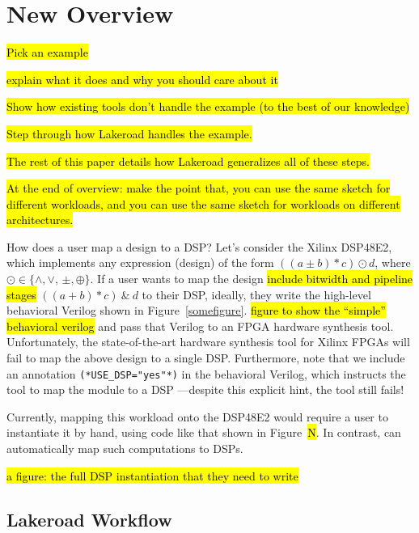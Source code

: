 \section{New Overview}
\label{sec:overview}
\hl{Pick an example}

\hl{explain what it does and why you should care about it}

\hl{Show how existing tools don't handle the example (to the best of our knowledge)}

\hl{Step through how Lakeroad handles the example.}

\hl{The rest of this paper details how Lakeroad generalizes all of these steps.}

\hl{At the end of overview: make the point that, you can use the same sketch for different workloads, and you can use the same sketch for workloads on different architectures.}


How does a user map a design to a DSP?
Let's consider the Xilinx DSP48E2,
  which implements any expression (design) of the form
  $((a \pm b) * c) \odot d$,
  where $\odot \in \{\land, \lor, \!\, \pm, \oplus \}$.
If a user wants to map the design
  \hl{include bitwidth and pipeline stages}
  $((a+b)*c) \:\&\: d$ to their DSP,
  ideally,
  they write the high-level behavioral Verilog
  shown in Figure~\cref{somefigure}.
\hl{figure to show the ``simple'' behavioral verilog}
  and pass that Verilog
  to an FPGA hardware synthesis tool.
Unfortunately,
  the state-of-the-art hardware synthesis tool
  for Xilinx FPGAs
  will fail to map the above design
  to a single DSP.
Furthermore, note that we include an annotation \texttt{(*USE\_DSP="yes"*)}
  in the behavioral Verilog,
  which instructs the tool
  to map the module to a DSP%
  ---despite this explicit hint,
  the tool still fails!

Currently, mapping this workload
  onto the DSP48E2
  would require a user to instantiate it by hand, 
  using code like that shown in Figure~\hl{N}.
In contrast, \lr can automatically map
  such computations to DSPs.
  
\hl{a figure: the full DSP instantiation that they need to write}


\subsection{Lakeroad Workflow}

